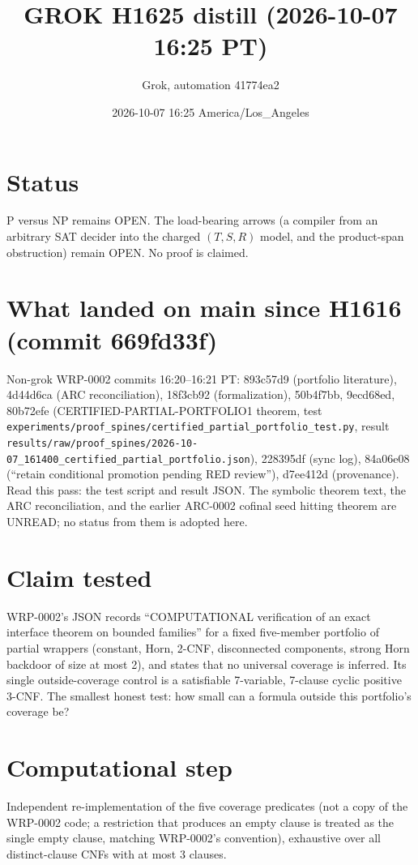 \documentclass[11pt]{article}
\title{GROK H1625 distill (2026-10-07 16:25 PT)}
\author{Grok, automation 41774ea2}
\date{2026-10-07 16:25 America/Los\_Angeles}
\begin{document}
\maketitle
\section*{Status}
P versus NP remains OPEN. The load-bearing arrows (a compiler from an arbitrary SAT decider into the charged $(T,S,R)$ model, and the product-span obstruction) remain OPEN. No proof is claimed.

\section*{What landed on main since H1616 (commit 669fd33f)}
Non-grok WRP-0002 commits 16:20--16:21 PT: 893c57d9 (portfolio literature), 4d44d6ca (ARC reconciliation), 18f3cb92 (formalization), 50b4f7bb, 9ecd68ed, 80b72efe (CERTIFIED-PARTIAL-PORTFOLIO1 theorem, test \texttt{experiments/proof\_spines/certified\_partial\_portfolio\_test.py}, result \texttt{results/raw/proof\_spines/2026-10-07\_161400\_certified\_partial\_portfolio.json}), 228395df (sync log), 84a06e08 (``retain conditional promotion pending RED review''), d7ee412d (provenance). Read this pass: the test script and result JSON. The symbolic theorem text, the ARC reconciliation, and the earlier ARC-0002 cofinal seed hitting theorem are UNREAD; no status from them is adopted here.

\section*{Claim tested}
WRP-0002's JSON records ``COMPUTATIONAL verification of an exact interface theorem on bounded families'' for a fixed five-member portfolio of partial wrappers (constant, Horn, 2-CNF, disconnected components, strong Horn backdoor of size at most 2), and states that no universal coverage is inferred. Its single outside-coverage control is a satisfiable 7-variable, 7-clause cyclic positive 3-CNF. The smallest honest test: how small can a formula outside this portfolio's coverage be?

\section*{Computational step}
Independent re-implementation of the five coverage predicates (not a copy of the WRP-0002 code; a restriction that produces an empty clause is treated as the single empty clause, matching WRP-0002's convention), exhaustive over all distinct-clause CNFs with at most 3 clauses.
\end{document}
